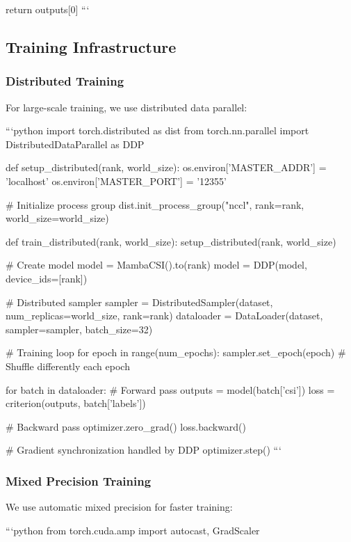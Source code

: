 \documentclass[10pt,journal,compsoc]{IEEEtran}
\begin{document}
        return outputs[0]
```

\subsection{Training Infrastructure}

\subsubsection{Distributed Training}

For large-scale training, we use distributed data parallel:

```python
import torch.distributed as dist
from torch.nn.parallel import DistributedDataParallel as DDP

def setup_distributed(rank, world_size):
    os.environ['MASTER_ADDR'] = 'localhost'
    os.environ['MASTER_PORT'] = '12355'
    
    # Initialize process group
    dist.init_process_group("nccl", rank=rank, world_size=world_size)

def train_distributed(rank, world_size):
    setup_distributed(rank, world_size)
    
    # Create model
    model = MambaCSI().to(rank)
    model = DDP(model, device_ids=[rank])
    
    # Distributed sampler
    sampler = DistributedSampler(dataset, num_replicas=world_size, rank=rank)
    dataloader = DataLoader(dataset, sampler=sampler, batch_size=32)
    
    # Training loop
    for epoch in range(num_epochs):
        sampler.set_epoch(epoch)  # Shuffle differently each epoch
        
        for batch in dataloader:
            # Forward pass
            outputs = model(batch['csi'])
            loss = criterion(outputs, batch['labels'])
            
            # Backward pass
            optimizer.zero_grad()
            loss.backward()
            
            # Gradient synchronization handled by DDP
            optimizer.step()
```

\subsubsection{Mixed Precision Training}

We use automatic mixed precision for faster training:

```python
from torch.cuda.amp import autocast, GradScaler
\end{document}
